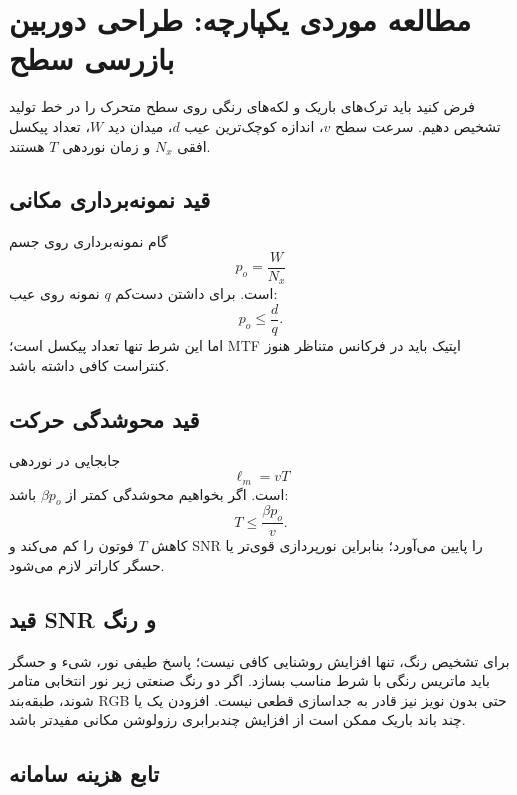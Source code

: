 \section{مطالعه موردی یکپارچه: طراحی دوربین بازرسی سطح}

فرض کنید باید ترک‌های باریک و لکه‌های رنگی روی سطح متحرک را در خط تولید تشخیص دهیم. سرعت سطح
\(v\)، اندازه کوچک‌ترین عیب \(d\)، میدان دید \(W\)، تعداد پیکسل افقی \(N_x\) و زمان نوردهی \(T\)
هستند.

\subsection{قید نمونه‌برداری مکانی}

گام نمونه‌برداری روی جسم
\begin{equation}
p_o=\frac{W}{N_x}
\end{equation}
است. برای داشتن دست‌کم \(q\) نمونه روی عیب:
\begin{equation}
p_o\le\frac{d}{q}.
\label{eq:defect-sampling}
\end{equation}
اما این شرط تنها تعداد پیکسل است؛ MTF اپتیک باید در فرکانس متناظر هنوز کنتراست کافی داشته باشد.

\subsection{قید محوشدگی حرکت}

جابجایی در نوردهی
\begin{equation}
\ell_m=vT
\end{equation}
است. اگر بخواهیم محوشدگی کمتر از \(\beta p_o\) باشد:
\begin{equation}
T\le\frac{\beta p_o}{v}.
\label{eq:exposure-motion}
\end{equation}
کاهش \(T\) فوتون را کم می‌کند و SNR را پایین می‌آورد؛ بنابراین نورپردازی قوی‌تر یا حسگر کاراتر لازم
می‌شود.

\subsection{قید SNR و رنگ}

برای تشخیص رنگ، تنها افزایش روشنایی کافی نیست؛ پاسخ طیفی نور، شیء و حسگر باید ماتریس رنگی با شرط
مناسب بسازد. اگر دو رنگ صنعتی زیر نور انتخابی متامر شوند، طبقه‌بند RGB حتی بدون نویز نیز قادر به
جداسازی قطعی نیست. افزودن یک یا چند باند باریک ممکن است از افزایش چندبرابری رزولوشن مکانی مفیدتر باشد.

\subsection{تابع هزینه سامانه}

